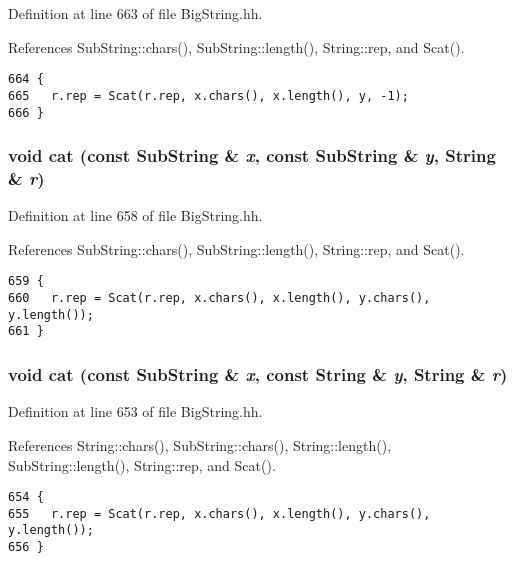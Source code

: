 Definition at line 663 of file Big\-String.hh.

References Sub\-String::chars(), Sub\-String::length(), String::rep, and Scat().



\footnotesize\begin{verbatim}664 {
665   r.rep = Scat(r.rep, x.chars(), x.length(), y, -1);
666 }
\end{verbatim}\normalsize 
{}
\subsubsection{\setlength{\rightskip}{0pt plus 5cm}void cat (const {\bf Sub\-String} \& {\em x}, const {\bf Sub\-String} \& {\em y}, {\bf String} \& {\em r})\hspace{0.3cm}{\tt  [inline]}}\label{BigString_8hh_a39}




Definition at line 658 of file Big\-String.hh.

References Sub\-String::chars(), Sub\-String::length(), String::rep, and Scat().



\footnotesize\begin{verbatim}659 {
660   r.rep = Scat(r.rep, x.chars(), x.length(), y.chars(), y.length());
661 }
\end{verbatim}\normalsize 
{}
\subsubsection{\setlength{\rightskip}{0pt plus 5cm}void cat (const {\bf Sub\-String} \& {\em x}, const {\bf String} \& {\em y}, {\bf String} \& {\em r})\hspace{0.3cm}{\tt  [inline]}}\label{BigString_8hh_a38}




Definition at line 653 of file Big\-String.hh.

References String::chars(), Sub\-String::chars(), String::length(), Sub\-String::length(), String::rep, and Scat().



\footnotesize\begin{verbatim}654 {
655   r.rep = Scat(r.rep, x.chars(), x.length(), y.chars(), y.length());
656 }
\end{verbatim}\normalsize 
{}
